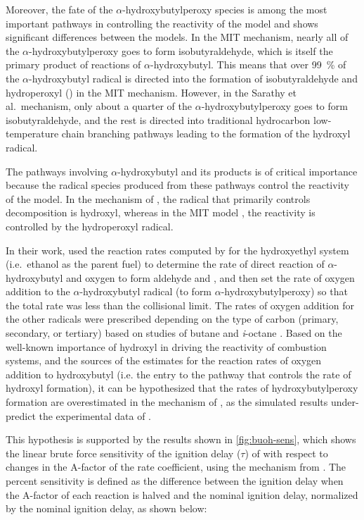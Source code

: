 \documentclass[../main.tex]{subfiles}
\begin{document}
Moreover, the fate of the $\alpha$-hydroxybutylperoxy species is
among the most important pathways in controlling the reactivity of the
model and shows significant differences between the models. In the MIT
mechanism, nearly all of the $\alpha$-hydroxybutylperoxy goes to form
isobutyraldehyde, which is itself the primary product of reactions of
$\alpha$-hydroxybutyl. This means that over \SI{99}{\percent} of the
$\alpha$-hydroxybutyl radical is directed into the formation of
isobutyraldehyde and hydroperoxyl () in the MIT mechanism.
However, in the Sarathy et al.\ mechanism, only about a quarter of the
$\alpha$-hydroxybutylperoxy goes to form isobutyraldehyde, and the rest
is directed into traditional hydrocarbon low-temperature chain branching
pathways leading to the formation of the hydroxyl radical.

The pathways involving $\alpha$-hydroxybutyl and its products is of
critical importance because the radical species produced from these
pathways control the reactivity of the model. In the mechanism of
\textcite{Sarathy2012}, the radical that primarily controls \iBuOH{}
decomposition is hydroxyl, whereas in the MIT model \cite{Weber2013a},
the reactivity is controlled by the hydroperoxyl radical.

In their work, \textcite{Sarathy2012} used the reaction rates computed by
\textcite{DaSilva2009} for the hydroxyethyl system (i.e.\ ethanol as the parent
fuel) to determine the rate of direct reaction of $\alpha$-hydroxybutyl and
oxygen to form aldehyde and , and then set the rate of oxygen addition to
the $\alpha$-hydroxybutyl radical (to form $\alpha$-hydroxybutylperoxy) so that
the total rate was less than the collisional limit. The rates of oxygen
addition for the other radicals were prescribed depending on the type of carbon
(primary, secondary, or tertiary) based on studies of butane and
\textit{i}-octane \cite{Sarathy2012}. Based on the well-known importance of
hydroxyl in driving the reactivity of combustion systems, and the sources of
the estimates for the reaction rates of oxygen addition to hydroxybutyl (i.e.
the entry to the pathway that controls the rate of hydroxyl formation), it can
be hypothesized that the rates of hydroxybutylperoxy formation are
overestimated in the mechanism of \textcite{Sarathy2012}, as the simulated
results under-predict the experimental data of \iBuOH{}.

This hypothesis is supported by the results shown in \cref{fig:buoh-sens},
which shows the linear brute force sensitivity of the ignition delay ($\tau$)
of \iBuOH{} with respect to changes in the $\mathrm{A}$-factor of the rate coefficient, using
the mechanism from \textcite{Sarathy2012}. The percent sensitivity is defined
as the difference between the ignition delay when the $\mathrm{A}$-factor of each reaction
is halved and the nominal ignition delay, normalized by the nominal ignition
delay, as shown below:
\end{document}
